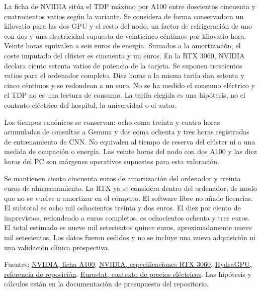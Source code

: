 {\begin{frame}[c]
{La ficha de NVIDIA sitúa el TDP máximo por A100 entre doscientos cincuenta y cuatrocientos vatios según la variante. Se considera de forma conservadora un kilovatio para las dos GPU y el resto del nodo, un factor de refrigeración de uno con dos y una electricidad supuesta de veinticinco céntimos por kilovatio hora. Veinte horas equivalen a seis euros de energía. Sumados a la amortización, el coste imputado del clúster es cincuenta y un euros. En la RTX 3060, NVIDIA declara ciento setenta vatios de potencia de la tarjeta. Se suponen trescientos vatios para el ordenador completo. Diez horas a la misma tarifa dan setenta y cinco céntimos y se redondean a un euro. No se ha medido el consumo eléctrico y el TDP no es una lectura de consumo. La tarifa elegida es una hipótesis, no el contrato eléctrico del hospital, la universidad o el autor.

Los tiempos canónicos se conservan: ocho coma treinta y cuatro horas acumuladas de consultas a Gemma y dos coma ochenta y tres horas registradas de entrenamiento de CNN. No equivalen al tiempo de reserva del clúster ni a una medida de ocupación o energía. Las veinte horas del nodo con dos A100 y las diez horas del PC son márgenes operativos supuestos para esta valoración.

Se mantienen ciento cincuenta euros de amortización del ordenador y treinta euros de almacenamiento. La RTX ya se considera dentro del ordenador, de modo que no se vuelve a amortizar en el cómputo. El software libre no añade licencias. El subtotal es ocho mil ochocientos treinta y dos euros. El diez por ciento de imprevistos, redondeado a euros completos, es ochocientos ochenta y tres euros. El total estimado es nueve mil setecientos quince euros, aproximadamente nueve mil setecientos. Los datos fueron cedidos y no se incluye una nueva adquisición ni una validación clínica prospectiva.

Fuentes: \href{https://www.nvidia.com/content/dam/en-zz/Solutions/Data-Center/a100/pdf/nvidia-a100-datasheet-us-nvidia-1758950-r4-web.pdf}{NVIDIA, ficha A100}. \href{https://www.nvidia.com/en-au/geforce/graphics-cards/30-series/rtx-3060-3060ti/}{NVIDIA, especificaciones RTX 3060}. \href{https://www.hydragpu.com/nvidia-a100-80gb-refurbished.html}{HydraGPU, referencia de reposición}. \href{https://ec.europa.eu/eurostat/statistics-explained/index.php?title=Electricity_price_statistics}{Eurostat, contexto de precios eléctricos}. Las hipótesis y cálculos están en la documentación de presupuesto del repositorio.}
\end{frame}}

